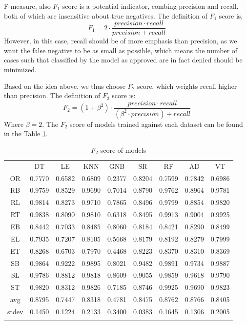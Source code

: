 F-measure\citep{Nancy}, also $F_1$ score is a potential indicator, combing precision and recall, both of which are insensitive about true negatives. The definition of $F_1$ score is,
\begin{equation}
F_1 = 2 \cdot \frac{precision \cdot recall}{precision + recall}
\end{equation}
However, in this case, recall should be of more emphasis than precision, as we want the false negative to be as small as possible, which means the number of cases such that classified by the model as approved are in fact denied should be minimized.

Based on the idea above, we thus choose $F_2$ score\citep{Van}, which weights recall higher than precision. The definition of $F_2$ score is:
\begin{equation}
F_2 = (1 + \beta ^2) \cdot \frac{precision \cdot recall}{(\beta ^2 \cdot precision) + recall}
\end{equation}
Where $\beta = 2$. The $F_2$ score of models trained against each dataset can be found in the Table \ref{tab: F2 score}.

\begin{table}[h]
\caption{$F_2$ score of models}
\label{tab: F2 score}       %
\begin{tabular}{ccccccccc}
\hline\noalign{\smallskip}
 & DT & LE & KNN &  GNB & SR & RF & AD & VT \\
\noalign{\smallskip}\hline\noalign{\smallskip}
OR & 0.7770 & 0.6582 & 0.6809 & 0.2377 & 0.8204 & 0.7599 & 0.7842 & 0.6986 \\
RB & 0.9759 & 0.8529 & 0.9690 & 0.7014 & 0.8790 & 0.9762 & 0.8964 & 0.9781\\
RL & 0.9814 & 0.8273 & 0.9710 & 0.7865 & 0.8496 & 0.9799 & 0.8854 & 0.9820\\
RT & 0.9838 & 0.8090 & 0.9810 & 0.6318 & 0.8495 & 0.9913 & 0.9004 & 0.9925\\
EB & 0.8442 & 0.7033 & 0.8485 & 0.8060 & 0.8184 & 0.8421 & 0.8290 & 0.8499\\
EL & 0.7935 & 0.7207 & 0.8105 & 0.5668 & 0.8179 & 0.8192 & 0.8279 & 0.7999\\
ET & 0.8268 & 0.6703 & 0.7970 & 0.4468 & 0.8223 & 0.8370 & 0.8310 & 0.8369\\
SB & 0.9864 & 0.9222 & 0.9895 & 0.8021 & 0.9482 & 0.9891 & 0.9734 & 0.9887\\
SL & 0.9786 & 0.8812 & 0.9818 & 0.8609 & 0.9055 & 0.9859 & 0.9618 & 0.9790\\
ST & 0.9820 & 0.8312 & 0.9826 & 0.7185 & 0.8746 & 0.9925 & 0.9690 & 0.9823\\
\noalign{\smallskip}\hline\noalign{\smallskip}
avg & 0.8795 & 0.7447 & 0.8318 & 0.4781 & 0.8475 & 0.8762 & 0.8766 & 0.8405\\
stdev & 0.1450 & 0.1224 & 0.2133 & 0.3400 & 0.0383 & 0.1645 & 0.1306 & 0.2005\\
\noalign{\smallskip}\hline
\end{tabular}
\end{table}

